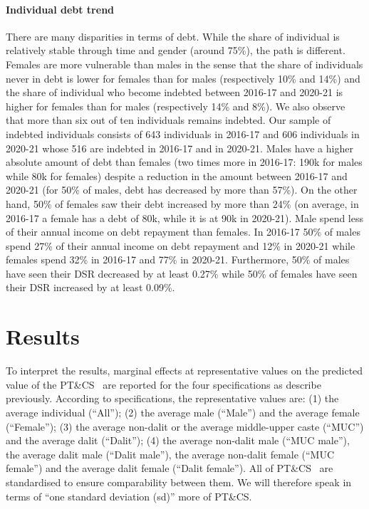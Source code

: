 \documentclass[a4paper, 12pt, onecolumn]{article}
\newcommand{\PTCS}{PT\&CS}
\begin{document}
\paragraph{Individual debt trend}
There are many disparities in terms of debt.
While the share of individual is relatively stable through time and gender (around 75\%), the path is different.
Females are more vulnerable than males in the sense that the share of individuals never in debt is lower for females than for males (respectively 10\% and 14\%) and the share of individual who become indebted between 2016-17 and 2020-21 is higher for females than for males (respectively 14\% and 8\%).
We also observe that more than six out of ten individuals remains indebted.
Our sample of indebted individuals consists of 643 individuals in 2016-17 and 606 individuals in 2020-21 whose 516 are indebted in 2016-17 and in 2020-21.
Males have a higher absolute amount of debt than females (two times more in 2016-17: \rupee190k for males while \rupee80k for females) despite a reduction in the amount between 2016-17 and 2020-21 (for 50\% of males, debt has decreased by more than 57\%).
On the other hand, 50\% of females saw their debt increased by more than 24\% (on average, in 2016-17 a female has a debt of \rupee80k, while it is at \rupee90k in 2020-21).
Male spend less of their annual income on debt repayment than females.
In 2016-17 50\% of males spend 27\% of their annual income on debt repayment and 12\% in 2020-21 while females spend 32\% in 2016-17 and 77\% in 2020-21.
Furthermore, 50\% of males have seen their DSR decreased by at least 0.27\% while 50\% of females have seen their DSR increased by at least 0.09\%.








\section{Results}
\label{section:results}

To interpret the results, marginal effects at representative values on the predicted value of the \PTCS~ are reported for the four specifications as describe previously.
According to specifications, the representative values are: (1) the average individual (``All''); (2) the average male (``Male'') and the average female (``Female''); (3) the average non-dalit or the average middle-upper caste (``MUC'') and the average dalit (``Dalit''); (4) the average non-dalit male (``MUC male''), the average dalit male (``Dalit male''), the average non-dalit female (``MUC female'') and the average dalit female (``Dalit female'').
All of \PTCS~ are standardised to ensure comparability between them.
We will therefore speak in terms of ``one standard deviation (sd)'' more of \PTCS.
\end{document}
